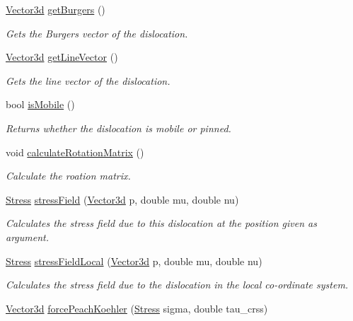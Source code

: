 \begin{DoxyCompactItemize}
\hyperlink{classVector3d}{Vector3d} \hyperlink{classDislocation_a8b9d5bfd379a6933b2dfd5d0962c9bc2}{get\-Burgers} ()
\begin{DoxyCompactList}\small\item\em Gets the Burgers vector of the dislocation. \end{DoxyCompactList}\item 
\hyperlink{classVector3d}{Vector3d} \hyperlink{classDislocation_a393b62c79e74458b7d69b4d28adc476e}{get\-Line\-Vector} ()
\begin{DoxyCompactList}\small\item\em Gets the line vector of the dislocation. \end{DoxyCompactList}\item 
bool \hyperlink{classDislocation_a6f9fa6b294f26af8f7e337988090bb80}{is\-Mobile} ()
\begin{DoxyCompactList}\small\item\em Returns whether the dislocation is mobile or pinned. \end{DoxyCompactList}\item 
void \hyperlink{classDislocation_aa249f1f46486fd183757ed5049586e73}{calculate\-Rotation\-Matrix} ()
\begin{DoxyCompactList}\small\item\em Calculate the roation matrix. \end{DoxyCompactList}\item 
\hyperlink{classStress}{Stress} \hyperlink{classDislocation_af61cedf5305080ce0f55eb7177efe529}{stress\-Field} (\hyperlink{classVector3d}{Vector3d} p, double mu, double nu)
\begin{DoxyCompactList}\small\item\em Calculates the stress field due to this dislocation at the position given as argument. \end{DoxyCompactList}\item 
\hyperlink{classStress}{Stress} \hyperlink{classDislocation_a163d6c52c2281a1b7fa9aab058c8fb84}{stress\-Field\-Local} (\hyperlink{classVector3d}{Vector3d} p, double mu, double nu)
\begin{DoxyCompactList}\small\item\em Calculates the stress field due to the dislocation in the local co-\/ordinate system. \end{DoxyCompactList}\item 
\hyperlink{classVector3d}{Vector3d} \hyperlink{classDislocation_a13df53ead0e78bc33594c6afabc41dcb}{force\-Peach\-Koehler} (\hyperlink{classStress}{Stress} sigma, double tau\-\_\-crss)

\end{DoxyCompactItemize}
